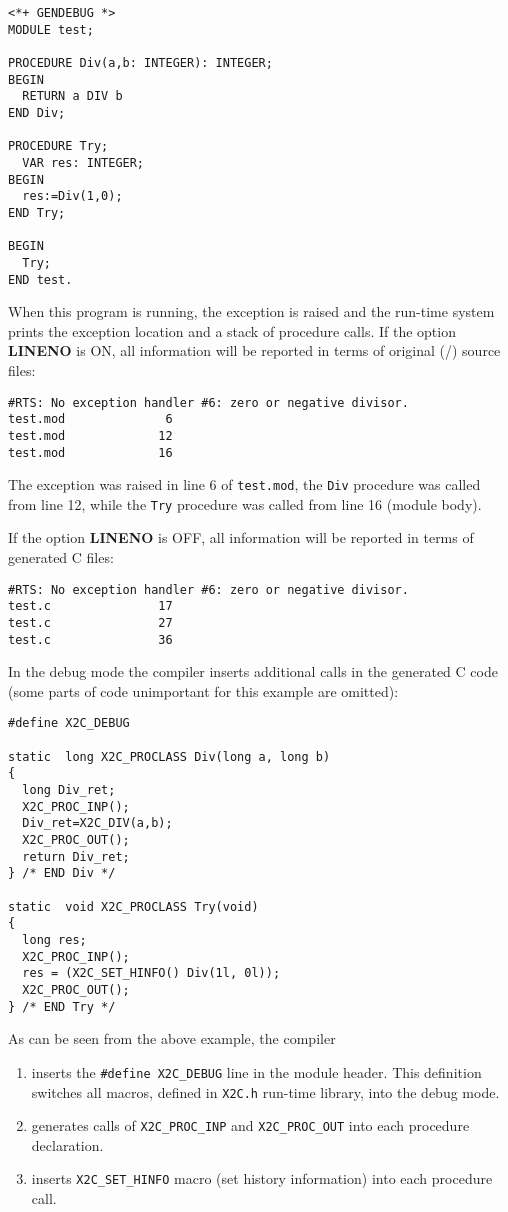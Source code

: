 \Example
\begin{verbatim}
<*+ GENDEBUG *>
MODULE test;

PROCEDURE Div(a,b: INTEGER): INTEGER;
BEGIN
  RETURN a DIV b
END Div;

PROCEDURE Try;
  VAR res: INTEGER;
BEGIN
  res:=Div(1,0);
END Try;

BEGIN
  Try;
END test.
\end{verbatim}

\noindent
When this program is running, the exception is raised and the
run-time system prints the exception location and a stack of
procedure calls.  If the option {\bf LINENO} is ON, all information
will be reported in terms of original (\ot{}/\mt{}) source files:
\begin{verbatim}
#RTS: No exception handler #6: zero or negative divisor.
test.mod              6
test.mod             12
test.mod             16
\end{verbatim}
The exception was raised in line 6 of {\tt test.mod},
the {\tt Div} procedure was called from line 12,
while the {\tt Try} procedure was called from line 16
(module body).

If the option {\bf LINENO} is OFF, all information will be reported in
terms of generated C files:
\begin{verbatim}
#RTS: No exception handler #6: zero or negative divisor.
test.c               17
test.c               27
test.c               36
\end{verbatim}

In the debug mode the compiler inserts additional calls in the generated
C code (some parts of code unimportant for this example are omitted):
\begin{verbatim}
#define X2C_DEBUG

static  long X2C_PROCLASS Div(long a, long b)
{
  long Div_ret;
  X2C_PROC_INP();
  Div_ret=X2C_DIV(a,b);
  X2C_PROC_OUT();
  return Div_ret;
} /* END Div */

static  void X2C_PROCLASS Try(void)
{
  long res;
  X2C_PROC_INP();
  res = (X2C_SET_HINFO() Div(1l, 0l));
  X2C_PROC_OUT();
} /* END Try */
\end{verbatim}
As can be seen from the above example, the compiler
\begin{enumerate}
\item
        inserts the \verb|#define X2C_DEBUG| line in the module header.
        This definition switches all macros,
        defined in {\tt X2C.h} run-time library, into the debug mode.

\item
        generates calls of \verb|X2C_PROC_INP| and \verb|X2C_PROC_OUT|
        into each procedure declaration.

\item
        inserts \verb|X2C_SET_HINFO| macro (set history information)
        into each procedure call.

\end{enumerate}

